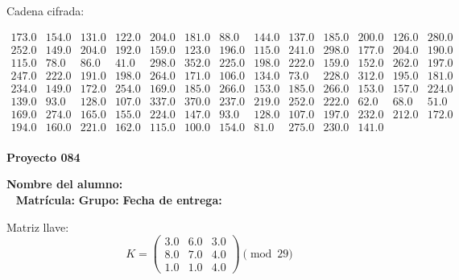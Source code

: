 \documentclass[12pt]{article}
\begin{document}
Cadena cifrada:
\begin{center}
$\begin{array}{lllllllllllll}
173.0 & 154.0 & 131.0 & 122.0 & 204.0 & 181.0 & 88.0 & 144.0 & 137.0 & 185.0 & 200.0 & 126.0 & 280.0\\
252.0 & 149.0 & 204.0 & 192.0 & 159.0 & 123.0 & 196.0 & 115.0 & 241.0 & 298.0 & 177.0 & 204.0 & 190.0\\
115.0 & 78.0 & 86.0 & 41.0 & 298.0 & 352.0 & 225.0 & 198.0 & 222.0 & 159.0 & 152.0 & 262.0 & 197.0\\
247.0 & 222.0 & 191.0 & 198.0 & 264.0 & 171.0 & 106.0 & 134.0 & 73.0 & 228.0 & 312.0 & 195.0 & 181.0\\
234.0 & 149.0 & 172.0 & 254.0 & 169.0 & 185.0 & 266.0 & 153.0 & 185.0 & 266.0 & 153.0 & 157.0 & 224.0\\
139.0 & 93.0 & 128.0 & 107.0 & 337.0 & 370.0 & 237.0 & 219.0 & 252.0 & 222.0 & 62.0 & 68.0 & 51.0\\
169.0 & 274.0 & 165.0 & 155.0 & 224.0 & 147.0 & 93.0 & 128.0 & 107.0 & 197.0 & 232.0 & 212.0 & 172.0\\
194.0 & 160.0 & 221.0 & 162.0 & 115.0 & 100.0 & 154.0 & 81.0 & 275.0 & 230.0 & 141.0\\
\end{array}$
\end{center}

\newpage


\textbf{Proyecto 084}

\textbf{Nombre del alumno:} \underline{\hspace{13cm}}\\\
\vspace{1cm}
\textbf{Matrícula:} \underline{\hspace{4cm}} \hspace{1cm}
\textbf{Grupo:} \underline{\hspace{2cm}}
\textbf{Fecha de entrega:} \underline{\hspace{2cm}}

\medskip

Matriz llave:
\[
K = \begin{pmatrix}
3.0 & 6.0 & 3.0\\
8.0 & 7.0 & 4.0\\
1.0 & 1.0 & 4.0
\end{pmatrix} \pmod{29}
\]
\end{document}
